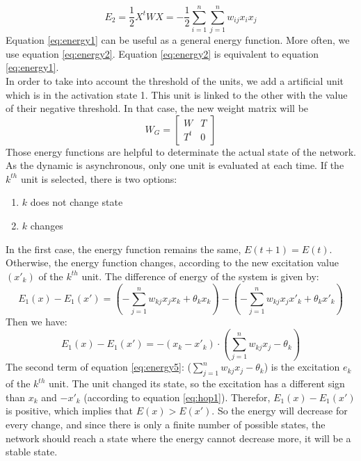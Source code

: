 \begin{equation}
\label{eq:energy2}
E_2 = \frac{1}{2}X^tWX = - \frac{1}{2}\sum_{i = 1}^{n}\sum_{j = 1}^{n}w_{ij} x_i x_j
\end{equation}
Equation \ref{eq:energy1} can be useful as a general energy function. More often, we use equation \ref{eq:energy2}. Equation \ref{eq:energy2} is equivalent to equation \ref{eq:energy1}.\\

In order to take into account the threshold of the units, we add a artificial unit which is in the activation state 1. This unit is linked to the other with the value of their negative threshold. In that case, the new weight matrix will be
\begin{equation}
\label{eq:energy3}
W_G = \begin{bmatrix}W & T \\T^t & 0 \end{bmatrix}
\end{equation}
Those energy functions are helpful to determinate the actual state of the network.\\

As the dynamic is asynchronous, only one unit is evaluated at each time. If the $k^{th}$ unit is selected, there is two options:

\begin{enumerate}
  \item $k$ does not change state
  \item $k$ changes 
\end{enumerate}
In the first case, the energy function remains the same, $E(t + 1) = E(t)$. Otherwise, the energy function changes, according to the new excitation value $(x'_k)$ of the $k^{th}$ unit. The difference of energy of the system is given by:
\begin{equation}
\label{eq:energy4}
E_1(x) - E_1(x') = (-\sum_{j = 1}^{n}w_{kj} x_j x_k + \theta_k x_k) - (-\sum_{j = 1}^{n} w_{kj} x_j x'_k + \theta_k x'_{k})
\end{equation}
Then we have:
\begin{equation}
\label{eq:energy5}
E_1(x) - E_1(x') = -(x_k - x'_k) \cdot (\sum_{j = 1}^{n} w_{kj}x_j - \theta_k)
\end{equation}
The second term of equation \ref{eq:energy5}: ($\sum_{j = 1}^{n} w_{kj}x_j - \theta_k$) is the excitation $e_k$ of the $k^{th}$ unit. The unit changed its state, so the excitation has a different sign than $x_k$ and $-x'_k$ (according to equation \ref{eq:hop1}). Therefor, $E_1(x) - E_1(x')$ is positive, which implies that $E(x) > E(x')$.  So the energy will decrease for every change, and since there is only a finite number of possible states, the network should reach a state where the energy cannot decrease more, it will be a stable state.\\

